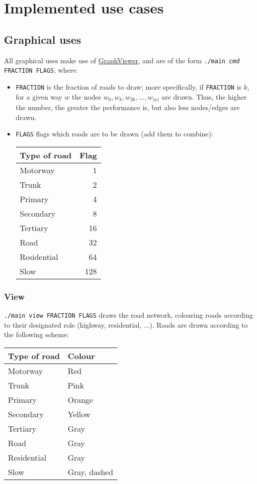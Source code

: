 \chapter{Implemented use cases} \label{implemented-use-cases}
\section{Graphical uses}
All graphical uses make use of \href{https://github.com/STEMS-group/GraphViewer}{GraphViewer}, and are of the form \texttt{./main \textit{cmd} FRACTION FLAGS}, where:
\begin{itemize}
    \item \texttt{FRACTION} is the fraction of roads to draw; more specifically, if \texttt{FRACTION} is $k$, for a given way $w$ the nodes $w_0, w_k, w_{2k},...,w_{|w|}$ are drawn. Thus, the higher the number, the greater the performance is, but also less nodes/edges are drawn.
    \item \texttt{FLAGS} flags which roads are to be drawn (add them to combine):
    \begin{center}
        \begin{tabular}{l | r}
            \textbf{Type of road} & \textbf{Flag} \\ \hline
            Motorway     &    1 \\
            Trunk        &    2 \\
            Primary      &    4 \\
            Secondary    &    8 \\
            Tertiary     &   16 \\
            Road         &   32 \\
            Residential  &   64 \\
            Slow         &  128
        \end{tabular}
    \end{center}
\end{itemize}
\subsection{View}
\texttt{./main view FRACTION FLAGS} draws the road network, colouring roads according to their designated role (highway, residential, ...). Roads are drawn according to the following scheme:
\begin{center}
    \begin{tabular}{l | l}
        \textbf{Type of road} & \textbf{Colour} \\ \hline
        Motorway              & Red          \\
        Trunk                 & Pink         \\
        Primary               & Orange       \\
        Secondary             & Yellow       \\
        Tertiary              & Gray         \\
        Road                  & Gray         \\
        Residential           & Gray         \\
        Slow                  & Gray, dashed
    \end{tabular}
\end{center}

